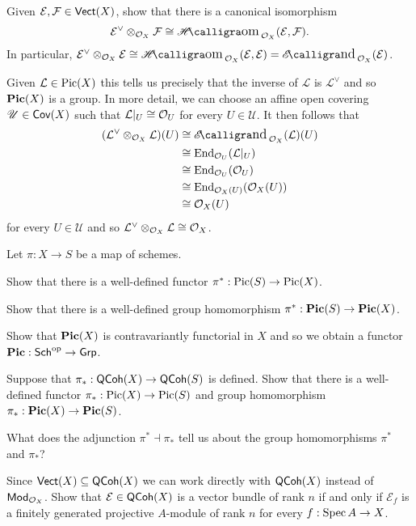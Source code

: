 \documentclass[11pt]{article}
\renewcommand{\F}{\mathcal{F}}
\newcommand{\EE}{\mathcal{E}}
\renewcommand{\L}{\mathcal{L}}
\newcommand{\U}{\mathscr{U}}
\begin{document}
\begin{exercise}
Given $\EE,\F\in\Vect(X)$, show that there is a canonical isomorphism 
$$\EE^{\vee}\tensor_{\O_X}\F\iso\HHom_{\O_X}(\EE,\F).$$ 
In particular, $\EE^{\vee}\tensor_{\O_X}\EE\iso\HHom_{\O_X}(\EE,\EE)=\EEnd_{\O_X}(\EE)$.
\end{exercise}

Given $\L\in\Pic(X)$ this tells us precisely that the inverse of $\L$ is $\L^{\vee}$ and so $\operatorname{\mathbf{Pic}}(X)$ is a group. In more detail, we can choose an affine open covering $\U\in\Cov(X)$ such that $\L|_U\iso\O_U$ for every $U\in\U$. It then follows that 
\begin{align*}
(\L^{\vee}\tensor_{\O_X}\L)(U)
&\iso\EEnd_{\O_X}(\L)(U) \\
&\iso\End_{\O_U}(\L|_U) \\
&\iso\End_{\O_U}(\O_U) \\
&\iso\End_{\O_X(U)}(\O_X(U)) \\
&\iso\O_X(U)
\end{align*}
for every $U\in\U$ and so $\L^{\vee}\tensor_{\O_X}\L\iso\O_X$.

\begin{exercise}
Let $\pi: X\to S$ be a map of schemes.
\begin{enum}{\alph}
\item Show that there is a well-defined functor $\pi^*: \operatorname{Pic}(S)\to\operatorname{Pic}(X)$.

\item Show that there is a well-defined group homomorphism $\pi^*: \operatorname{\mathbf{Pic}}(S)\to\operatorname{\mathbf{Pic}}(X)$.

\item Show that $\operatorname{\mathbf{Pic}}(X)$ is contravariantly functorial in $X$ and so we obtain a functor $\operatorname{\mathbf{Pic}}: \operatorname{\mathsf{Sch}}^{\operatorname{op}}\to\operatorname{\mathsf{Grp}}$.

\item Suppose that $\pi_*: \operatorname{\mathsf{QCoh}}(X)\to\operatorname{\mathsf{QCoh}}(S)$ is defined. Show that there is a well-defined functor $\pi_*: \operatorname{Pic}(X)\to\operatorname{Pic}(S)$ and group homomorphism $\pi_*: \operatorname{\mathbf{Pic}}(X)\to\operatorname{\mathbf{Pic}}(S)$.

\item What does the adjunction $\pi^*\dashv\pi_*$ tell us about the group homomorphisms $\pi^*$ and $\pi_*$?
\end{enum}
\end{exercise}

\begin{exercise}
Since $\operatorname{\mathsf{Vect}}(X)\subseteq\operatorname{\mathsf{QCoh}}(X)$ we can work directly with $\operatorname{\mathsf{QCoh}}(X)$ instead of $\operatorname{\mathsf{Mod}}_{\mathcal{O}_X}$. Show that $\EE\in\QCoh(X)$ is a vector bundle of rank $n$ if and only if $\EE_f$ is a finitely generated projective $A$-module of rank $n$ for every $f: \operatorname{Spec} A\to X$.
\end{exercise}
\end{document}
